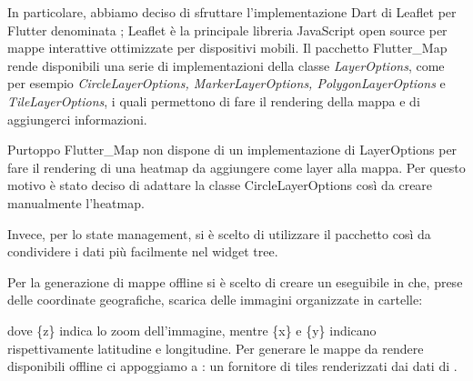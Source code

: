 \documentclass[a4paper]{report}
\begin{document}
In particolare, abbiamo deciso di sfruttare l'implementazione Dart di Leaflet per Flutter denominata \cite{FlutterMap}; Leaflet è la principale libreria JavaScript open source per mappe interattive ottimizzate per dispositivi mobili. Il pacchetto Flutter\_Map rende disponibili una serie di implementazioni della classe \textit{LayerOptions}, come per esempio \textit{CircleLayerOptions, MarkerLayerOptions, PolygonLayerOptions} e \textit{TileLayerOptions}, i quali permettono di fare il rendering della mappa e di aggiungerci informazioni. 

Purtoppo Flutter\_Map non dispone di un implementazione di LayerOptions per fare il rendering di una heatmap da aggiungere come layer alla mappa. Per questo motivo è stato deciso di adattare la classe CircleLayerOptions così da creare manualmente l'heatmap.

Invece, per lo state management, si è scelto di utilizzare il pacchetto \cite{Provider} così da condividere i dati più facilmente nel widget tree. 
 
Per la generazione di mappe offline si è scelto di creare un eseguibile in \cite{Rust} che, prese delle coordinate geografiche, scarica delle immagini organizzate in cartelle:
\begin{center}
    {\setnewpathsep{/} }
\end{center}
dove \{z\} indica lo zoom dell'immagine, mentre \{x\} e \{y\} indicano rispettivamente latitudine e longitudine.
Per generare le mappe da rendere disponibili offline ci appoggiamo a \cite{Thunderforest}: un fornitore di tiles renderizzati dai dati di \cite{OpenStreetMap}.

\end{document}
